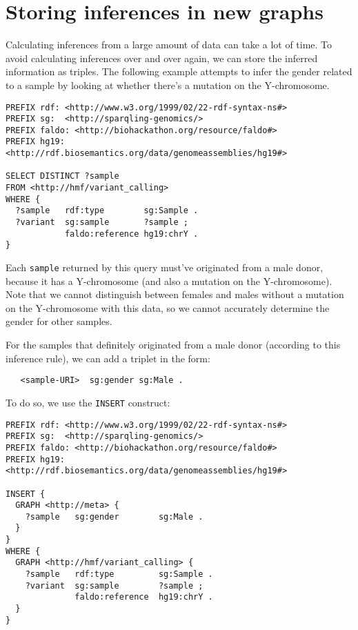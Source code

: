 \section{Storing inferences in new graphs}
\label{sec:storing-inferences-in-new-graphs}

  Calculating inferences from a large amount of data can take a lot of time.
  To avoid calculating inferences over and over again, we can store the
  inferred information as triples.  The following example attempts to infer
  the gender related to a sample by looking at whether there's a mutation on
  the Y-chromosome.

\begin{siderules}
\begin{verbatim}
PREFIX rdf: <http://www.w3.org/1999/02/22-rdf-syntax-ns#>
PREFIX sg:  <http://sparqling-genomics/>
PREFIX faldo: <http://biohackathon.org/resource/faldo#>
PREFIX hg19:  <http://rdf.biosemantics.org/data/genomeassemblies/hg19#>

SELECT DISTINCT ?sample
FROM <http://hmf/variant_calling>
WHERE {
  ?sample   rdf:type        sg:Sample .
  ?variant  sg:sample       ?sample ;
            faldo:reference hg19:chrY .
}
\end{verbatim}
\end{siderules}

 Each \texttt{sample} returned by this query must've originated from a male
 donor, because it has a Y-chromosome (and also a mutation on the
 Y-chromosome).  Note that we cannot distinguish between females and males
 without a mutation on the Y-chromosome with this data, so we cannot accurately
 determine the gender for other samples.

 For the samples that definitely originated from a male donor (according to
 this inference rule), we can add a triplet in the form:

\begin{siderules}
\begin{verbatim}
   <sample-URI>  sg:gender sg:Male .
\end{verbatim}
\end{siderules}

  To do so, we use the \texttt{INSERT} construct:

\begin{siderules}
\begin{verbatim}
PREFIX rdf: <http://www.w3.org/1999/02/22-rdf-syntax-ns#>
PREFIX sg:  <http://sparqling-genomics/>
PREFIX faldo: <http://biohackathon.org/resource/faldo#>
PREFIX hg19:  <http://rdf.biosemantics.org/data/genomeassemblies/hg19#>

INSERT {
  GRAPH <http://meta> {
    ?sample   sg:gender        sg:Male .
  }
}
WHERE {
  GRAPH <http://hmf/variant_calling> {
    ?sample   rdf:type         sg:Sample .
    ?variant  sg:sample        ?sample ;
              faldo:reference  hg19:chrY .
  }
}
\end{verbatim}
\end{siderules}

